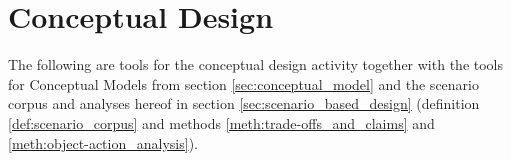 \section{Conceptual Design} \label{sec:conceptual_design}
The following are tools for the conceptual design activity together with the tools for Conceptual Models from section \ref{sec:conceptual_model} and the scenario corpus and analyses hereof in section \ref{sec:scenario_based_design} (definition \ref{def:scenario_corpus} and methods \ref{meth:trade-offs_and_claims} and \ref{meth:object-action_analysis}).


